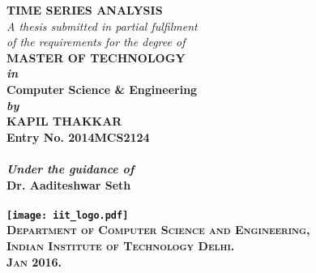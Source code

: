 \begin{titlepage}
\begin{center}

\LARGE{\textsf{\bfseries TIME SERIES ANALYSIS}}\\
\vspace{20pt}
\normalsize
\emph{A thesis submitted in partial fulfilment} \\
\emph{of the requirements for the degree of} \\
\vspace{20pt}
\bfseries MASTER OF TECHNOLOGY \\
\vspace{20pt}
\emph {in}\\
\vspace{20pt}
\bfseries Computer Science \& Engineering \\
\vspace{20pt}
\emph {by}\\
\vspace{20pt}
\Large{\textsf{\bfseries KAPIL THAKKAR}} \\
{\normalsize \textsf{\bfseries Entry No. 2014MCS2124}}\\
\ \\
{\normalsize \emph {Under the guidance of}}
\ \\
\Large{\textsf{\bfseries Dr. Aaditeshwar Seth}} \\
\ \\
\vspace{30pt}
\texttt{[image: iit\_logo.pdf]} \\
\vspace{10pt}
\large{\textsc{Department of Computer Science and Engineering,\\
Indian Institute of Technology Delhi.\\ Jan 2016.}}
\end{center}
\end{titlepage}
